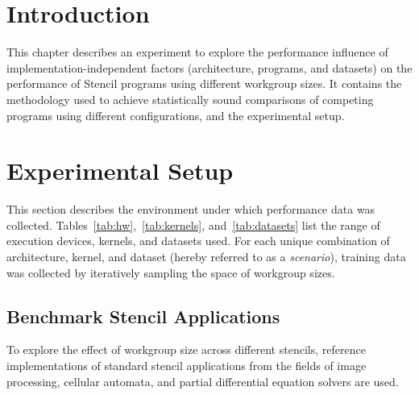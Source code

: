 \section{Introduction}

This chapter describes an experiment to explore the performance
influence of implementation-independent factors (architecture,
programs, and datasets) on the performance of Stencil programs using
different workgroup sizes. It contains the methodology used to achieve
statistically sound comparisons of competing programs using different
configurations, and the experimental setup.


\section{Experimental Setup}

This section describes the environment under which performance data
was collected. Tables~\ref{tab:hw},~\ref{tab:kernels},
and~\ref{tab:datasets} list the range of execution devices, kernels,
and datasets used. For each unique combination of architecture,
kernel, and dataset (hereby referred to as a \emph{scenario}),
training data was collected by iteratively sampling the space of
workgroup sizes.


\subsection{Benchmark Stencil Applications}

To explore the effect of workgroup size across different stencils,
reference implementations of standard stencil applications from the
fields of image processing, cellular automata, and partial
differential equation solvers are used.

